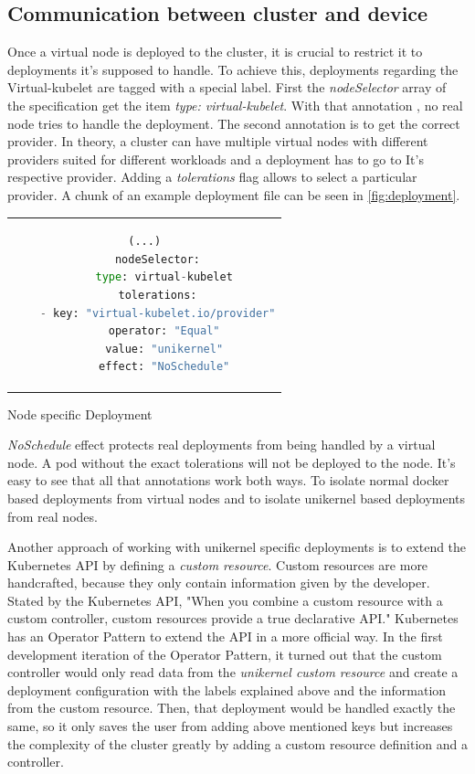 \subsection{Communication between cluster and device}
Once a virtual node is deployed to the cluster, it is crucial to restrict it to deployments it's supposed to handle. To achieve this, deployments regarding the Virtual-kubelet are tagged with a special label. First the \textit{nodeSelector} array of the specification get the item \textit{type: virtual-kubelet}. With that annotation , no real node tries to handle the deployment. The second annotation is to get the correct provider. In theory, a cluster can have multiple virtual nodes with different providers suited for different workloads and a deployment has to go to It's respective provider. Adding a \textit{tolerations} flag allows to select a particular provider. A chunk of an example deployment file can be seen in \ref{fig:deployment}.

\begin{code}[htpb]
  \centering
  \begin{tabular}{c}
  \begin{lstlisting}[language=python]
    (...)
    nodeSelector:
      type: virtual-kubelet
    tolerations:
    - key: "virtual-kubelet.io/provider"
      operator: "Equal"
      value: "unikernel"
      effect: "NoSchedule"
\end{lstlisting}
\end{tabular}
\caption{Node specific Deployment}\label{fig:deployment}
\end{code}
\textit{NoSchedule} effect protects real deployments from being handled by a virtual node. A pod without the exact tolerations will not be deployed to the node. It's easy to see that all that annotations work both ways. To isolate normal docker based deployments from virtual nodes and to isolate unikernel based deployments from real nodes.

Another approach of working with unikernel specific deployments is to extend the Kubernetes API by defining a \textit{custom resource}. Custom resources are more handcrafted, because they only contain information given by the developer. Stated by the Kubernetes API, "When you combine a custom resource with a custom controller, custom resources provide a true declarative API." Kubernetes has an Operator Pattern to extend the API in a more official way. In the first development iteration of the Operator Pattern, it turned out that the custom controller would only read data from the \textit{unikernel custom resource} and create a deployment configuration with the labels explained above and the information from the custom resource. Then, that deployment would be handled exactly the same, so it only saves the user from adding above mentioned keys but increases the complexity of the cluster greatly by adding a custom resource definition and a controller.


